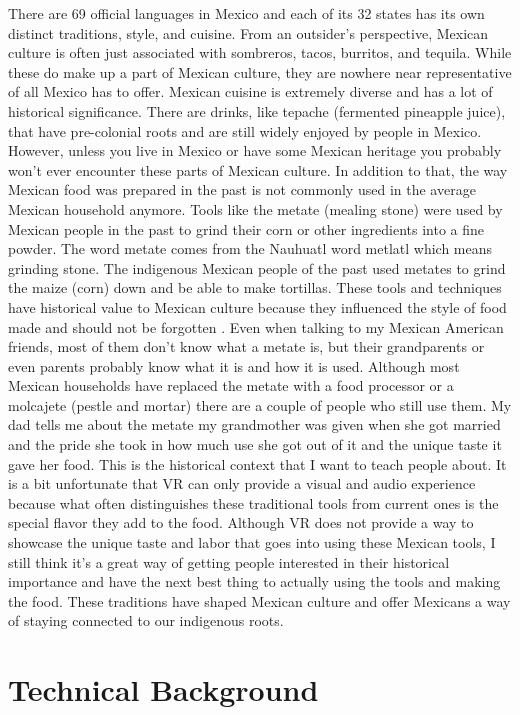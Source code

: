 \documentclass[11pt,twocolumn]{article}
\begin{document}
There are 69 official languages in Mexico and each of its 32 states has its own distinct traditions, style, and cuisine. From an outsider’s perspective, Mexican culture is often just associated with sombreros, tacos, burritos, and tequila. While these do make up a part of Mexican culture, they are nowhere near representative of all Mexico has to offer. Mexican cuisine is extremely diverse and has a lot of historical significance. There are drinks, like tepache (fermented pineapple juice), that have pre-colonial roots and are still widely enjoyed by people in Mexico. However, unless you live in Mexico or have some Mexican heritage you probably won’t ever encounter these parts of Mexican culture. In addition to that, the way Mexican food was prepared in the past is not commonly used in the average Mexican household anymore. Tools like the metate (mealing stone) were used by Mexican people in the past to grind their corn or other ingredients into a fine powder. The word metate comes from the Nauhuatl word metlatl which means grinding stone. The indigenous Mexican people of the past used metates to grind the maize (corn) down and be able to make tortillas. These tools and techniques have historical value to Mexican culture because they influenced the style of food made and should not be forgotten . Even when talking to my Mexican American friends, most of them don’t know what a metate is, but their grandparents or even parents probably know what it is and how it is used. Although most Mexican households have replaced the metate with a food processor or a molcajete (pestle and mortar) there are a couple of people who still use them. My dad tells me about the metate my grandmother was given when she got married and the pride she took in how much use she got out of it and the unique taste it gave her food. This is the historical context that I want to teach people about. It is a bit unfortunate that VR can only provide a visual and audio experience because what often distinguishes these traditional tools from current ones is the special flavor they add to the food. Although VR does not provide a way to showcase the unique taste and labor that goes into using these Mexican tools, I still think it’s a great way of getting people interested in their historical importance and have the next best thing to actually using the tools and making the food. These traditions have shaped Mexican culture and offer Mexicans a way of staying connected to our indigenous roots. 
 
 

\section{Technical Background}
\end{document}
